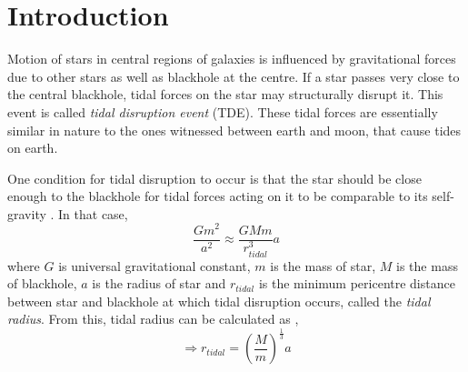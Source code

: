 \documentclass{tda}
\begin{document}

\section{Introduction}

Motion of stars in central regions of galaxies is influenced by gravitational forces due to other stars as well as blackhole at the centre. If a star passes very close to the central blackhole, tidal forces on the star may structurally disrupt it. This event is called \emph{tidal disruption event} (TDE). These tidal forces are essentially similar in nature to the ones witnessed between earth and moon, that cause tides on earth. 

One condition for tidal disruption to occur is that the star should be close enough to the blackhole for tidal forces acting on it to be comparable to its self-gravity \cite{hills_possible_1975}. In that case, 
\[\frac{G m^2}{a^2} \approx \frac{G M m}{r_{tidal}^3} a\]
where \(G\) is universal gravitational constant, \(m\) is the mass of star, \(M\) is the mass of blackhole, \(a\) is the radius of star and \(r_{tidal}\) is the minimum pericentre distance between star and blackhole at which tidal disruption occurs, called the \emph{tidal radius}. From this, tidal radius can be calculated as \cite{rees_tidal_1988}, 
\begin{equation}
	\Rightarrow r_{tidal} = \left( \frac{M}{m} \right) ^{\frac{1}{3}} a
	\label{eq:tidal_radius}
\end{equation}
\end{document}

